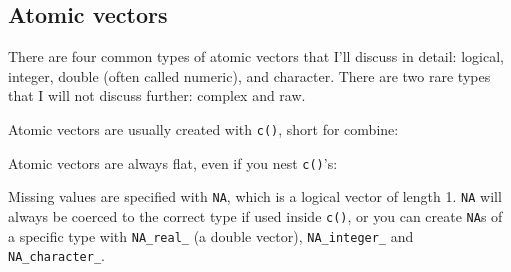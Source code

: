 \subsection{Atomic vectors}

There are four common types of atomic vectors that I'll discuss in
detail: logical, integer, double (often called numeric), and character.
There are two rare types that I will not discuss further: complex and
raw.  

Atomic vectors are usually created with \texttt{c()}, short for combine:

\begin{Shaded}
\begin{Highlighting}[]
\StringTok{ }\NormalTok{(}\NormalTok{, }\NormalTok{, }\NormalTok{)}
\StringTok{ }
\StringTok{ }\NormalTok{(}\NormalTok{, }
\StringTok{ }\NormalTok{(}\NormalTok{, }\NormalTok{)}
\end{Highlighting}
\end{Shaded}

Atomic vectors are always flat, even if you nest \texttt{c()}'s:

\begin{Shaded}
\begin{Highlighting}[]
\NormalTok{(}\NormalTok{, }\NormalTok{(}\NormalTok{, }\NormalTok{(}\NormalTok{, }\NormalTok{)))}
\NormalTok{(}\NormalTok{, }\NormalTok{, }\NormalTok{, }\NormalTok{)}
\end{Highlighting}
\end{Shaded}

Missing values are specified with \texttt{NA}, which is a logical vector
of length 1. \texttt{NA} will always be coerced to the correct type if
used inside \texttt{c()}, or you can create \texttt{NA}s of a specific
type with \texttt{NA\_real\_} (a double vector), \texttt{NA\_integer\_}
and \texttt{NA\_character\_}. 

